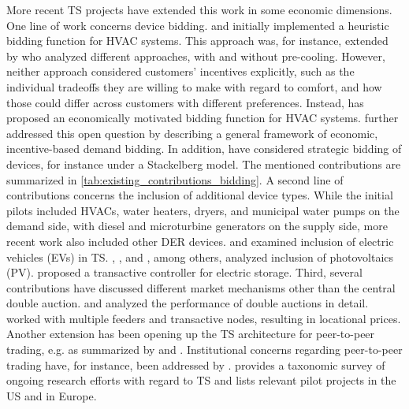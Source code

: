 \documentclass[12pt]{article}{Definitions/mdpi}
\begin{document}
More recent TS projects have extended this work in some economic dimensions. 
One line of work concerns device bidding.
\citet{PNNL2006} and \citet{hammerstrom_2008} initially implemented a heuristic bidding function for HVAC systems. This approach was, for instance, extended by \citet{adhikari_simulation_2016} who analyzed different approaches, with and without pre-cooling.
However, neither approach considered customers' incentives explicitly, such as the individual tradeoffs they are willing to make with regard to comfort, and how those could differ across customers with different preferences.
Instead, \citet{Arlt2020} has proposed an economically motivated bidding function for HVAC systems.
\citet{widergren_transactive_2017} further addressed this open question by describing a general framework of economic, incentive-based demand bidding.
In addition, \citet{lian_transactive_2020} have considered strategic bidding of devices, for instance under a Stackelberg model. The mentioned contributions are summarized in \cref{tab:existing_contributions_bidding}.
A second line of contributions concerns the inclusion of additional device types. While the initial pilots included HVACs, water heaters, dryers, and municipal water pumps on the demand side, with diesel and microturbine generators on the supply side, more recent work also included other DER devices.
\citet{behboodi_integration_2016} and \citet{behboodi_electric_2016} examined inclusion of electric vehicles (EVs) in TS. 
\citet{sajjadi_transactive_2016}, \citet{ableitner_user_2020}, and \citet{mengelkamp_decentralizing_2018}, among others, analyzed inclusion of photovoltaics (PV).
\citet{parandehgheibi_two-layer_2017} proposed a transactive controller for electric storage.
Third, several contributions have discussed different market mechanisms other than the central double auction. \citet{fuller_analysis_2011} and \citet{Arlt2020} analyzed the performance of double auctions in detail. \citet{widergren_residential_2014} worked with multiple feeders and transactive nodes, resulting in locational prices. Another extension has been opening up the TS architecture for peer-to-peer trading, e.g. as summarized by \citet{zhang_review_2017} and \citet{sousa_peer--peer_2019}.
Institutional concerns regarding peer-to-peer trading have, for instance, been addressed by \citet{masiello_sharing_2016}.
\citet{abrishambaf_towards_2019} provides a taxonomic survey of ongoing research efforts with regard to TS and lists relevant pilot projects in the US and in Europe. 
\end{document}
